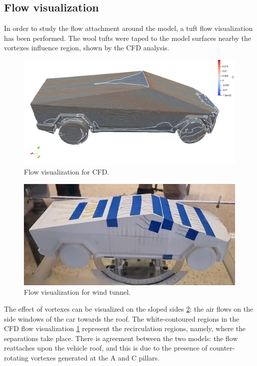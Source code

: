 \documentclass{elbioimp2}
\begin{document}
\subsection{Flow visualization}
In order to study the flow attachment around the model, a tuft flow visualization has been performed. The wool tufts were taped to the model surfaces nearby the vortexes influence region, shown by the CFD analysis. 
\begin{figure}[htp]
        \centering
        \includegraphics[width=1\columnwidth]{tufts2.png}
        \caption{Flow visualization for CFD.\label{tufts2}}
    \end{figure}

\begin{figure}[htp]
        \centering
        \includegraphics[width=1\columnwidth]{tufts1.png}
        \caption{Flow visualization for wind tunnel.\label{tufts1}}
    \end{figure}
The effect of vortexes can be visualized on the sloped sides \ref{tufts1}: the air flows on the side windows of the car towards the roof. The white-contoured regions in the CFD flow visualization \ref{tufts2} represent the recirculation regions, namely, where the separations take place. There is agreement between the two models: the flow reattaches upon the vehicle roof, and this is due to the presence of counter-rotating vortexes generated at the A and C pillars.
\end{document}
